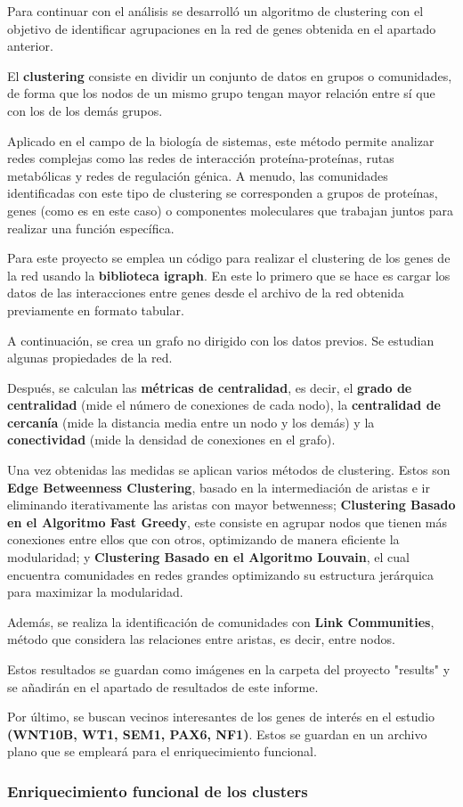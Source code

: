 Para continuar con el análisis se desarrolló un algoritmo de clustering con el objetivo de identificar agrupaciones en la red de genes obtenida en el apartado anterior.


El \textbf{clustering} consiste en dividir un conjunto de datos en grupos o comunidades, de forma que los nodos de un mismo grupo tengan mayor relación entre sí que con los de los demás grupos.

Aplicado en el campo de la biología de sistemas, este método permite analizar redes complejas como las redes de interacción proteína-proteínas, rutas metabólicas y redes de regulación génica. A menudo, las comunidades identificadas con este tipo de clustering se corresponden a grupos de proteínas, genes (como es en este caso) o componentes moleculares que trabajan juntos para realizar una función específica.

Para este proyecto se emplea un código para realizar el clustering de los genes de la red usando la \textbf{biblioteca igraph}. En este lo primero que se hace es cargar los datos de las interacciones entre genes desde el archivo de la red obtenida previamente en formato tabular.

A continuación, se crea un grafo no dirigido con los datos previos. Se estudian algunas propiedades de la red.

Después, se calculan las \textbf{métricas de centralidad}, es decir, el \textbf{grado de centralidad} (mide el número de conexiones de cada nodo), la \textbf{centralidad de cercanía} (mide la distancia media entre un nodo y los demás) y la \textbf{conectividad} (mide la densidad de conexiones en el grafo).

Una vez obtenidas las medidas se aplican varios métodos de clustering. Estos son \textbf{Edge Betweenness Clustering}, basado en la intermediación de aristas e ir eliminando iterativamente las aristas con mayor betwenness; \textbf{Clustering Basado en el Algoritmo Fast Greedy}, este consiste en agrupar nodos que tienen más conexiones entre ellos que con otros, optimizando de manera eficiente la modularidad; y \textbf{Clustering Basado en el Algoritmo Louvain}, el cual encuentra comunidades en redes grandes optimizando su estructura jerárquica para maximizar la modularidad.

Además, se realiza la identificación de comunidades con \textbf{Link Communities}, método que considera las relaciones entre aristas, es decir, entre nodos.

Estos resultados se guardan como imágenes en la carpeta del proyecto "results" y se añadirán en el apartado de resultados de este informe.

Por último, se buscan vecinos interesantes de los genes de interés en el estudio \textbf{(WNT10B, WT1, SEM1, PAX6, NF1)}. Estos se guardan en un archivo plano que se empleará para el enriquecimiento funcional.

\subsubsection{Enriquecimiento funcional de los clusters}